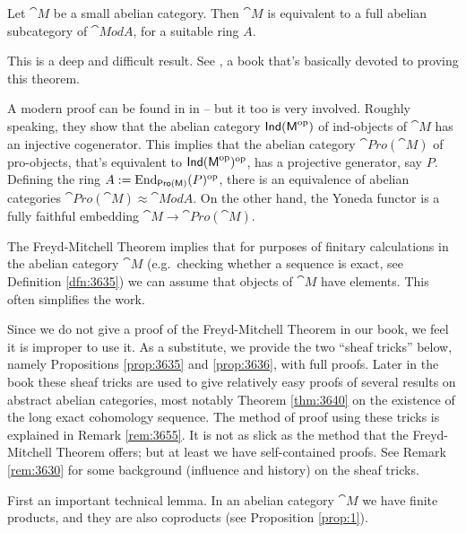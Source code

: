 \begin{thm}
Let $\cat{M}$ be a small abelian category. Then $\cat{M}$ is equivalent to a
full abelian subcategory of $\cat{Mod} A$, for a suitable ring $A$. 
\end{thm}

\begin{rem} \label{rem:4091}
This is a deep and difficult result. See \cite{Fre}, a book that's basically 
devoted to proving this theorem. 

A modern proof can be found in
in \cite[Theorem 9.6.10]{KaSc2} -- but it too is very involved. Roughly 
speaking, they show that the abelian category $\operatorname{\mathsf{Ind}}(\operatorname{\mathsf{M}}^{\mathrm{op}})$ 
of ind-objects of $\cat{M}$ has an injective cogenerator. This implies that the 
abelian category $\cat{Pro}(\cat{M})$ of pro-objects, that's equivalent 
to $\operatorname{\mathsf{Ind}}(\operatorname{\mathsf{M}}^{\mathrm{op}})^{\mathrm{op}}$,
has a projective generator, say $P$. Defining the ring 
$A := \operatorname{End}_{\operatorname{\mathsf{Pro}}(\operatorname{\mathsf{M}})}(P)^{\mathrm{op}}$,
there is an equivalence of abelian categories
$\cat{Pro}(\cat{M}) \approx \cat{Mod} A$.
On the other hand, the Yoneda functor is a fully faithful embedding 
$\cat{M} \to \cat{Pro}(\cat{M})$.
\end{rem}

The Freyd-Mitchell Theorem implies that for 
purposes of finitary calculations in the abelian category $\cat{M}$ 
(e.g.\ checking whether a sequence is exact, 
see Definition \ref{dfn:3635}) we can assume that objects of $\cat{M}$ 
have elements. This often simplifies the work.

Since we do not give a proof of the Freyd-Mitchell Theorem in our book, 
we feel it is improper to use it. As a substitute, we provide the two 
``sheaf tricks'' below, namely Propositions \ref{prop:3635} and 
\ref{prop:3636}, with full proofs. Later in the book these sheaf tricks are 
used to give relatively easy proofs of several results on abstract abelian 
categories, most notably Theorem \ref{thm:3640} 
on the existence of the long exact 
cohomology sequence. The method of proof using these tricks is explained in  
Remark \ref{rem:3655}. It is not as slick as the method that the Freyd-Mitchell 
Theorem offers; but at least we have self-contained proofs. See Remark 
\ref{rem:3630} for some background (influence and history) on the sheaf tricks. 

First an important technical lemma. In an abelian category $\cat{M}$ we have 
finite products, and they are also coproducts (see Proposition 
\ref{prop:1}). 
 
